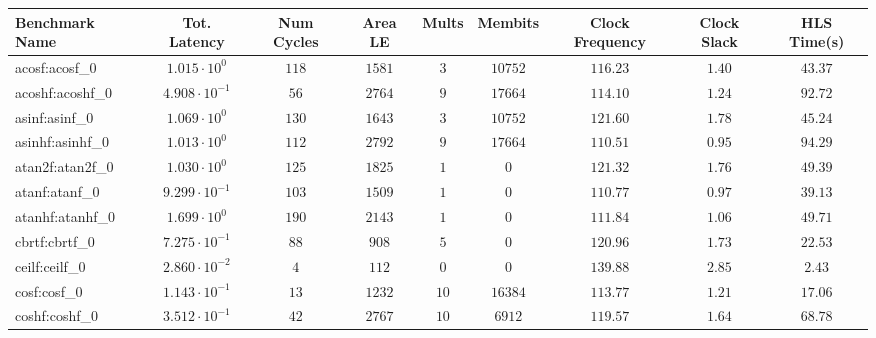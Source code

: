 \begin{tabular}{|l|c|c|c|c|c|c|c|c|}
\hline
Benchmark Name               & Tot. Latency            & Num Cycles & Area LE   & Mults   & Membits    & Clock Frequency & Clock Slack & HLS Time(s) \\
\hline
acosf:acosf\_0               & $ 1.015 \cdot 10^{0}  $ & $ 118    $ & $ 1581  $ & $ 3   $ & $ 10752  $ & $ 116.23      $ & $ 1.40    $ & $ 43.37   $ \\
acoshf:acoshf\_0             & $ 4.908 \cdot 10^{-1} $ & $ 56     $ & $ 2764  $ & $ 9   $ & $ 17664  $ & $ 114.10      $ & $ 1.24    $ & $ 92.72   $ \\
asinf:asinf\_0               & $ 1.069 \cdot 10^{0}  $ & $ 130    $ & $ 1643  $ & $ 3   $ & $ 10752  $ & $ 121.60      $ & $ 1.78    $ & $ 45.24   $ \\
asinhf:asinhf\_0             & $ 1.013 \cdot 10^{0}  $ & $ 112    $ & $ 2792  $ & $ 9   $ & $ 17664  $ & $ 110.51      $ & $ 0.95    $ & $ 94.29   $ \\
atan2f:atan2f\_0             & $ 1.030 \cdot 10^{0}  $ & $ 125    $ & $ 1825  $ & $ 1   $ & $ 0      $ & $ 121.32      $ & $ 1.76    $ & $ 49.39   $ \\
atanf:atanf\_0               & $ 9.299 \cdot 10^{-1} $ & $ 103    $ & $ 1509  $ & $ 1   $ & $ 0      $ & $ 110.77      $ & $ 0.97    $ & $ 39.13   $ \\
atanhf:atanhf\_0             & $ 1.699 \cdot 10^{0}  $ & $ 190    $ & $ 2143  $ & $ 1   $ & $ 0      $ & $ 111.84      $ & $ 1.06    $ & $ 49.71   $ \\
cbrtf:cbrtf\_0               & $ 7.275 \cdot 10^{-1} $ & $ 88     $ & $ 908   $ & $ 5   $ & $ 0      $ & $ 120.96      $ & $ 1.73    $ & $ 22.53   $ \\
ceilf:ceilf\_0               & $ 2.860 \cdot 10^{-2} $ & $ 4      $ & $ 112   $ & $ 0   $ & $ 0      $ & $ 139.88      $ & $ 2.85    $ & $ 2.43    $ \\
cosf:cosf\_0                 & $ 1.143 \cdot 10^{-1} $ & $ 13     $ & $ 1232  $ & $ 10  $ & $ 16384  $ & $ 113.77      $ & $ 1.21    $ & $ 17.06   $ \\
coshf:coshf\_0               & $ 3.512 \cdot 10^{-1} $ & $ 42     $ & $ 2767  $ & $ 10  $ & $ 6912   $ & $ 119.57      $ & $ 1.64    $ & $ 68.78   $ \\

\end{tabular}
